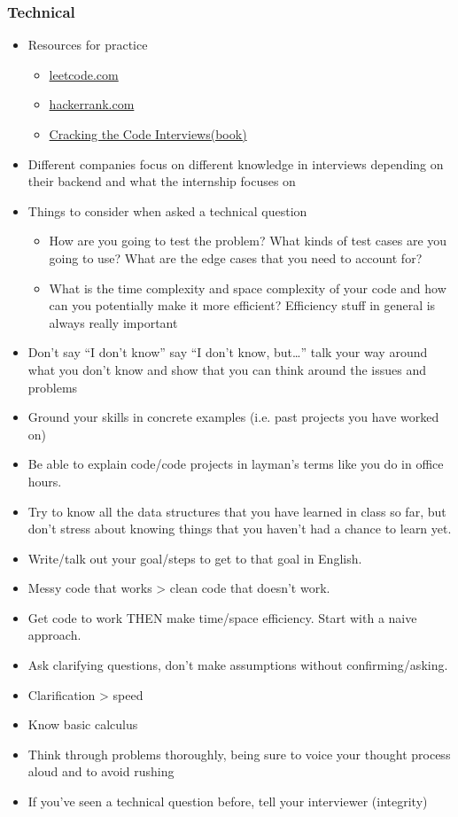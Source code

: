 \documentclass[a4paper]{article}
\begin{document}
\begin{itemize}
\subsubsection{Technical}
\begin{itemize}
\item Resources for practice
\begin{itemize}
\item \href{leetcode.com}{leetcode.com}
\item \href{hackerrank.com}{hackerrank.com}
\item \href{https://www.amazon.com/Cracking-Coding-Interview-Programming-Questions/dp/0984782850/ref=pd_lpo_sbs_14_img_0?_encoding=UTF8&psc=1&refRID=FZB5N025M099WJDENG89}{Cracking the Code Interviews(book)}
\end{itemize}
\item Different companies focus on different knowledge in interviews depending on their backend and what the internship focuses on
\item Things to consider when asked a technical question
\begin{itemize}
\item How are you going to test the problem? What kinds of test cases are you going to use? What are the edge cases that you need to account for?
\item What is the time complexity and space complexity of your code and how can you potentially make it more efficient? Efficiency stuff in general is always really important
\end{itemize}
\item Don’t say “I don’t know” say “I don’t know, but…” talk your way around what you don’t know and show that you can think around the issues and problems	
\item Ground your skills in concrete examples (i.e. past projects you have worked on)
\item Be able to explain code/code projects in layman's terms like you do in office hours.
\item Try to know all the data structures that you have learned in class so far, but don’t stress about knowing things that you haven’t had a chance to learn yet.
\item Write/talk out your goal/steps to get to that goal in English.
\item Messy code that works > clean code that doesn't work.
\item Get code to work THEN make time/space efficiency. Start with a naive approach.
\item Ask clarifying questions, don’t make assumptions without confirming/asking.
\item Clarification > speed
\item Know basic calculus
\item Think through problems thoroughly, being sure to voice your thought process aloud and to avoid rushing
\item If you’ve seen a technical question before, tell your interviewer (integrity)
\end{itemize}

\end{itemize}
\end{document}
